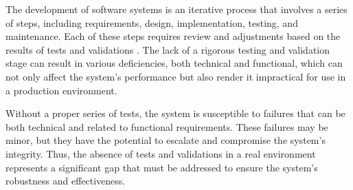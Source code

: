 The development of software systems is an iterative process that involves a series of steps, including requirements, design, implementation, testing, and maintenance. Each of these steps requires review and adjustments based on the results of tests and validations \cite{coleman2006softwareProcess}. The lack of a rigorous testing and validation stage can result in various deficiencies, both technical and functional, which can not only affect the system's performance but also render it impractical for use in a production environment.

Without a proper series of tests, the system is susceptible to failures that can be both technical and related to functional requirements. These failures may be minor, but they have the potential to escalate and compromise the system's integrity. Thus, the absence of tests and validations in a real environment represents a significant gap that must be addressed to ensure the system's robustness and effectiveness.